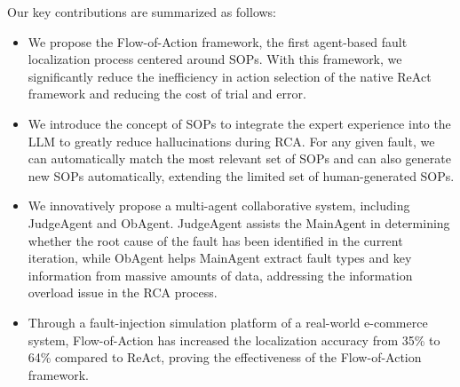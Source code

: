 Our key contributions are summarized as follows:
\begin{itemize}
    \item We propose the Flow-of-Action framework, the first agent-based fault localization process centered around SOPs. With this framework, we significantly reduce the inefficiency in action selection of the native ReAct framework and reducing the cost of trial and error.

    \item We introduce the concept of SOPs to integrate the expert experience into the LLM to greatly reduce hallucinations during RCA. For any given fault, we can automatically match the most relevant set of SOPs and can also generate new SOPs automatically, extending the limited set of human-generated SOPs.

    \item We innovatively propose a multi-agent collaborative system, including JudgeAgent and ObAgent. JudgeAgent assists the MainAgent in determining whether the root cause of the fault has been identified in the current iteration, while ObAgent helps MainAgent extract fault types and key information from massive amounts of data, addressing the information overload issue in the RCA process.

    \item Through a fault-injection simulation platform of a real-world e-commerce system, Flow-of-Action has increased the localization accuracy from 35\% to 64\% compared to ReAct, proving the effectiveness of the Flow-of-Action framework.

\end{itemize}
